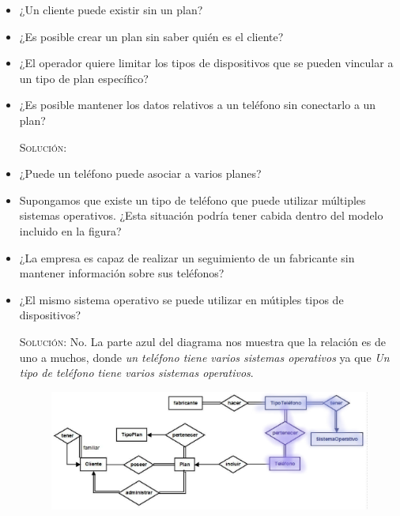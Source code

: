 \documentclass[letterpaper,11pt]{article}
\begin{document}
\begin{itemize}
\begin{itemize}
    \item ¿Un cliente puede existir sin un plan?
    
    \item ¿Es posible crear un plan sin saber quién es el cliente?

    \item ¿El operador quiere limitar los tipos de dispositivos que se pueden 
    vincular a un tipo de plan específico?

    \item ¿Es posible mantener los datos relativos a un teléfono sin conectarlo
    a un plan?

    \textsc{Solución:}

    \item ¿Puede un teléfono puede asociar a varios planes?
    
    \item Supongamos que existe un tipo de teléfono que puede utilizar múltiples
    sistemas operativos. ¿Esta situación podría tener cabida dentro del modelo 
    incluido en la figura?

    \item ¿La empresa es capaz de realizar un seguimiento de un fabricante sin 
    mantener información sobre sus teléfonos?

    \item ¿El mismo sistema operativo se puede utilizar en mútiples tipos de  
    dispositivos? 

    \textsc{Solución:} No. La parte azul del diagrama nos muestra que la 
    relación es de uno a muchos, donde \textit{un teléfono tiene varios 
    sistemas operativos} ya que \textit{Un tipo de teléfono tiene varios 
    sistemas operativos}. 

    \begin{figure}[h]
        \centering
        \includegraphics[scale=0.4]{./imagenes/modelo9.jpg}
    \end{figure}


\end{itemize}
\end{itemize}
\end{document}

